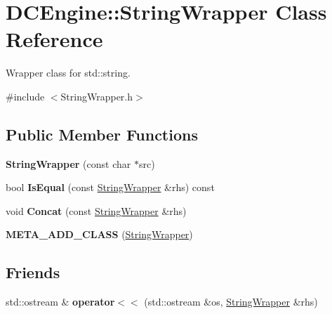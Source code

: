 \hypertarget{classDCEngine_1_1StringWrapper}{\section{D\-C\-Engine\-:\-:String\-Wrapper Class Reference}
\label{classDCEngine_1_1StringWrapper}
}


Wrapper class for std\-::string.  




{\ttfamily \#include $<$String\-Wrapper.\-h$>$}

\subsection*{Public Member Functions}
\begin{DoxyCompactItemize}
\item 
\hypertarget{classDCEngine_1_1StringWrapper_ad75434bf7a203c37b4a4efd3d0ed7bd0}{{\bfseries String\-Wrapper} (const char $\ast$src)}\label{classDCEngine_1_1StringWrapper_ad75434bf7a203c37b4a4efd3d0ed7bd0}

\item 
\hypertarget{classDCEngine_1_1StringWrapper_a42fb3923908c02abddd1903fe6fc27de}{bool {\bfseries Is\-Equal} (const \hyperlink{classDCEngine_1_1StringWrapper}{String\-Wrapper} \&rhs) const }\label{classDCEngine_1_1StringWrapper_a42fb3923908c02abddd1903fe6fc27de}

\item 
\hypertarget{classDCEngine_1_1StringWrapper_a64c2d5bb6c6d9e9d684186992dd40402}{void {\bfseries Concat} (const \hyperlink{classDCEngine_1_1StringWrapper}{String\-Wrapper} \&rhs)}\label{classDCEngine_1_1StringWrapper_a64c2d5bb6c6d9e9d684186992dd40402}

\item 
\hypertarget{classDCEngine_1_1StringWrapper_afabb0e3cea60c8391d30df36c2e66a30}{{\bfseries M\-E\-T\-A\-\_\-\-A\-D\-D\-\_\-\-C\-L\-A\-S\-S} (\hyperlink{classDCEngine_1_1StringWrapper}{String\-Wrapper})}\label{classDCEngine_1_1StringWrapper_afabb0e3cea60c8391d30df36c2e66a30}

\end{DoxyCompactItemize}
\subsection*{Friends}
\begin{DoxyCompactItemize}
\item 
\hypertarget{classDCEngine_1_1StringWrapper_ae05dfcbd79eab9136f97906c7f15ad82}{std\-::ostream \& {\bfseries operator$<$$<$} (std\-::ostream \&os, \hyperlink{classDCEngine_1_1StringWrapper}{String\-Wrapper} \&rhs)}\label{classDCEngine_1_1StringWrapper_ae05dfcbd79eab9136f97906c7f15ad82}

\end{DoxyCompactItemize}


